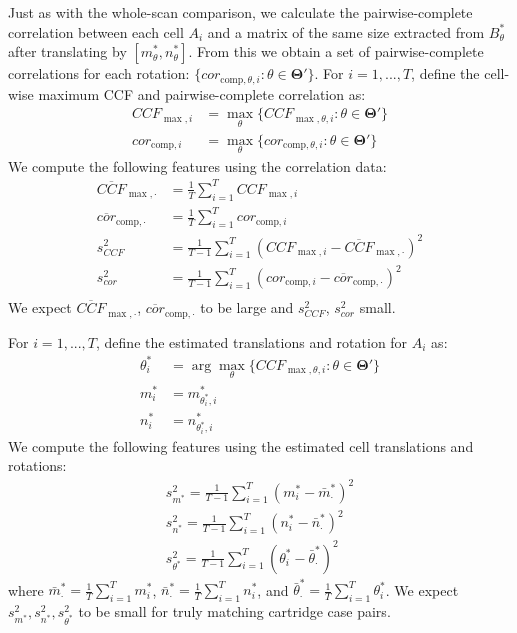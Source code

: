 \documentclass[
]{jdssv}
\begin{document}
Just as with the whole-scan comparison, we calculate the
pairwise-complete correlation between each cell \(A_i\) and a matrix of
the same size extracted from \(B^*_{\theta}\) after translating by
\([m^*_\theta,n^*_\theta]\). From this we obtain a set of
pairwise-complete correlations for each rotation:
\(\{cor_{\text{comp},\theta,i} : \theta \in \pmb{\Theta}'\}\). For
\(i = 1,...,T\), define the cell-wise maximum CCF and pairwise-complete
correlation as: \begin{align*}
CCF_{\max,i} &= \max_{\theta} \{CCF_{\max,\theta,i} : \theta \in \pmb{\Theta}'\} \\
cor_{\text{comp},i} &= \max_{\theta} \{cor_{\text{comp},\theta,i} : \theta \in \pmb{\Theta}'\}
\end{align*} We compute the following features using the correlation
data: \begin{align*}
\overline{CCF}_{\max, \cdot} &= \frac{1}{T} \sum_{i=1}^T CCF_{\max,i} \\
\overline{cor}_{\text{comp}, \cdot} &= \frac{1}{T} \sum_{i=1}^T cor_{\text{comp},i} \\
s_{CCF}^2 &= \frac{1}{T-1} \sum_{i=1}^T (CCF_{\max,i} - \overline{CCF}_{\max, \cdot})^2  \\
s_{cor}^2 &= \frac{1}{T-1} \sum_{i=1}^T (cor_{\text{comp},i} - \overline{cor}_{\text{comp}, \cdot})^2  \\
\end{align*} We expect \(\overline{CCF}_{\max, \cdot}\),
\(\overline{cor}_{\text{comp}, \cdot}\) to be large and \(s_{CCF}^2\),
\(s_{cor}^2\) small.

For \(i = 1,...,T\), define the estimated translations and rotation for
\(A_i\) as: \begin{align*}
\theta^*_i &= \arg \max_{\theta} \{CCF_{\max,\theta,i} : \theta \in \pmb{\Theta}'\} \\
m^*_i &= m^*_{\theta^*_i,i} \\
n^*_i &= n^*_{\theta^*_i,i}
\end{align*} We compute the following features using the estimated cell
translations and rotations: \begin{align*}
s_{m^*}^2 = \frac{1}{T-1} \sum_{i=1}^T (m^*_{i} - \bar{m}^*_{\cdot})^2 \\
s_{n^*}^2 = \frac{1}{T-1} \sum_{i=1}^T (n^*_{i} - \bar{n}^*_{\cdot})^2 \\
s_{\theta^*}^2 = \frac{1}{T-1} \sum_{i=1}^T (\theta^*_{i} - \bar{\theta}^*_{\cdot})^2
\end{align*} where
\(\bar{m}^*_{\cdot} = \frac{1}{T} \sum_{i=1}^T m^*_{i}\),
\(\bar{n}^*_{\cdot} = \frac{1}{T} \sum_{i=1}^T n^*_{i}\), and
\(\bar{\theta}^*_{\cdot} = \frac{1}{T} \sum_{i=1}^T \theta^*_{i}\). We
expect \(s_{m^*}^2, s_{n^*}^2, s_{\theta^*}^2\) to be small for truly
matching cartridge case pairs.
\end{document}
